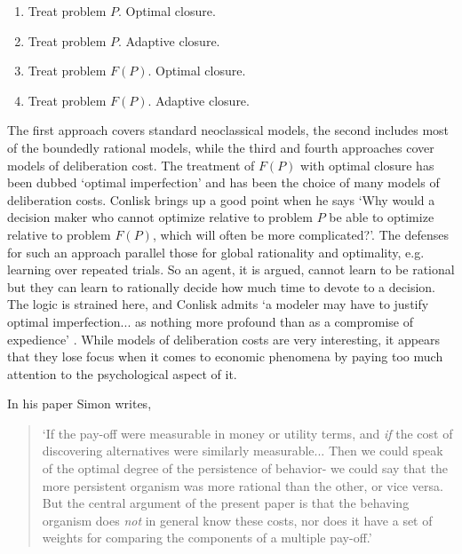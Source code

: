 \documentclass{ucthesis}
\begin{document}
\begin{enumerate}
\item Treat problem $P$. Optimal closure.

\item Treat problem $P$. Adaptive closure.

\item Treat problem $F\left( P\right) $. Optimal closure.

\item Treat problem $F\left( P\right) $. Adaptive closure.
\end{enumerate}

The first approach covers standard neoclassical models, the second includes
most of the boundedly rational models, while the third and fourth approaches
cover models of deliberation cost. The treatment of $F\left( P\right) $ with
optimal closure has been dubbed `optimal imperfection' and has been the
choice of many models of deliberation costs. Conlisk brings up a good point
when he says `Why would a decision maker who cannot optimize relative to
problem $P$ be able to optimize relative to problem $F(P)$, which will often
be more complicated?'\cite[pp. 689]{conlisk}. The defenses for such an
approach parallel those for global rationality and optimality, e.g. learning
over repeated trials. So an agent, it is argued, cannot learn to be rational
but they can learn to rationally decide how much time to devote to a
decision. The logic is strained here, and Conlisk admits `a modeler may have
to justify optimal imperfection... as nothing more profound than as a
compromise of expedience' \cite[pp. 690]{conlisk}. While models of
deliberation costs are very interesting, it appears that they lose focus
when it comes to economic phenomena by paying too much attention to the
psychological aspect of it.

In his paper Simon writes,

\begin{quotation}
`If the pay-off were measurable in money or utility terms, and \textit{if}
the cost of discovering alternatives were similarly measurable... Then we
could speak of the optimal degree of the persistence of behavior- we could
say that the more persistent organism was more rational than the other, or
vice versa. But the central argument of the present paper is that the
behaving organism does \textit{not }in general know these costs, nor does it
have a set of weights for comparing the components of a multiple pay-off.' 
\cite[pp.112]{Simon BMRC}
\end{quotation}
\end{document}
